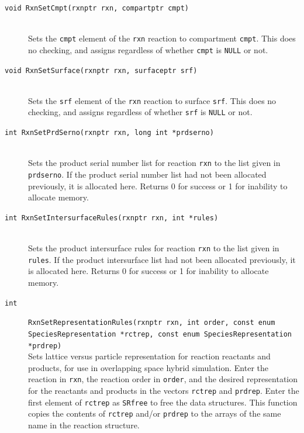 \documentclass {scrbook}
\newcommand {\ttt} {\texttt}
\begin{document}
\begin{description}
\item[\ttt{void RxnSetCmpt(rxnptr rxn, compartptr cmpt)}]
\hfill \\
Sets the \ttt{cmpt} element of the \ttt{rxn} reaction to compartment \ttt{cmpt}. This does no checking, and assigns regardless of whether \ttt{cmpt} is \ttt{NULL} or not.

\item[\ttt{void RxnSetSurface(rxnptr rxn, surfaceptr srf)}]
\hfill \\
Sets the \ttt{srf} element of the \ttt{rxn} reaction to surface \ttt{srf}. This does no checking, and assigns regardless of whether \ttt{srf} is \ttt{NULL} or not.

\item[\ttt{int RxnSetPrdSerno(rxnptr rxn, long int *prdserno)}]
\hfill \\
Sets the product serial number list for reaction \ttt{rxn} to the list given in \ttt{prdserno}. If the product serial number list had not been allocated previously, it is allocated here. Returns 0 for success or 1 for inability to allocate memory.

\item[\ttt{int RxnSetIntersurfaceRules(rxnptr rxn, int *rules)}]
\hfill \\
Sets the product intersurface rules for reaction \ttt{rxn} to the list given in \ttt{rules}. If the product intersurface list had not been allocated previously, it is allocated here. Returns 0 for success or 1 for inability to allocate memory.

\item[\ttt{int}]
\ttt{RxnSetRepresentationRules(rxnptr rxn, int order, const enum SpeciesRepresentation *rctrep, const enum SpeciesRepresentation *prdrep)}
\hfill \\
Sets lattice versus particle representation for reaction reactants and products, for use in overlapping space hybrid simulation. Enter the reaction in \ttt{rxn}, the reaction order in \ttt{order}, and the desired representation for the reactants and products in the vectors \ttt{rctrep} and \ttt{prdrep}. Enter the first element of \ttt{rctrep} as \ttt{SRfree} to free the data structures. This function copies the contents of \ttt{rctrep} and/or \ttt{prdrep} to the arrays of the same name in the reaction structure.


\end{description}
\end{document}
